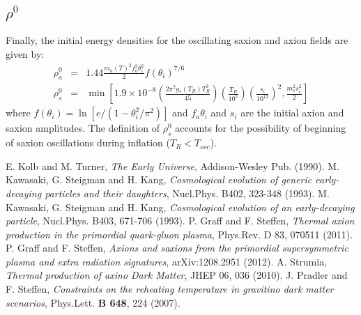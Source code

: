 \documentclass[preprint,notoc]{JHEP3}
\begin{document}
\subsection{$\rho^0$}
Finally, the initial energy densities for the oscillating saxion and axion fields are given by:
\begin{eqnarray*}
\rho^0_a & = & 1.44  \frac{m_a(T)^2 f_a^2 \theta_i^2 }{2} f(\theta_i)^{7/6}\\
\rho^0_s & = & \min\left[1.9 \times 10^{-8}\left(\frac{2\pi^2 g_*(T_R) T_R^3}{45}\right)\left(\frac{T_R}{10^5}\right)\left(\frac{s_i}{10^{12}}\right)^2,\frac{m_s^2 s_i^2}{2}\right]	
\end{eqnarray*}
where $f(\theta_i) = \ln[e/(1-\theta_i^2/\pi^2)]$ and $f_a \theta_i$ and $s_i$ are the initial axion and saxion amplitudes. 
The definition of $\rho^0_s$ accounts for the possibility of beginning of saxion oscillations during inflation ($T_R < T_{osc}$).

%
\begin{thebibliography}{99}
%
 E. Kolb and M. Turner, {\it The Early Universe}, Addison-Wesley Pub. (1990).
%
 M. Kawasaki, G. Steigman and H. Kang, {\it Cosmological evolution of generic early-decaying
particles and their daughters}, Nucl.Phys. B402, 323-348 (1993).
%
 M. Kawasaki, G. Steigman and H. Kang, {\it Cosmological evolution of an early-decaying particle}, Nucl.Phys. B403, 671-706 (1993).
%
 P. Graff and F. Steffen, {\it Thermal axion production in the primordial quark-gluon plasma}, Phys.Rev. D 83, 070511 (2011).
%
 P. Graff and F. Steffen, {\it Axions and saxions from the primordial supersymmetric plasma and extra radiation signatures}, arXiv:1208.2951 (2012).
%
 A. Strumia, {\it Thermal production of axino Dark Matter}, JHEP 06, 036 (2010).
%
 J. Pradler and F. Steffen, {\it Constraints on the reheating temperature in gravitino dark matter scenarios}, Phys.Lett. {\bf B 648}, 224 (2007).
%
\end{thebibliography}
\end{document}
